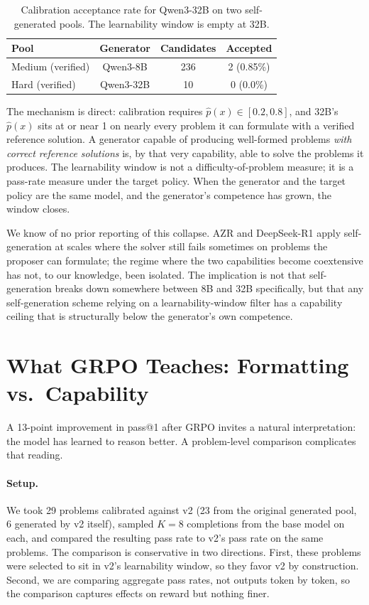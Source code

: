 \documentclass[11pt,a4paper]{article}
\begin{document}
\begin{table}[ht]
\centering
\caption{Calibration acceptance rate for Qwen3-32B on two self-generated pools. The learnability window is empty at 32B.}
\label{tab:scale-selfgen}
\begin{tabular}{lccc}
\toprule
Pool & Generator & Candidates & Accepted \\
\midrule
Medium (verified) & Qwen3-8B & 236 & 2 (0.85\%) \\
Hard (verified) & Qwen3-32B & 10 & 0 (0.0\%) \\
\bottomrule
\end{tabular}
\end{table}

The mechanism is direct: calibration requires $\hat{p}(x) \in [0.2, 0.8]$, and 32B's $\hat{p}(x)$ sits at or near 1 on nearly every problem it can formulate with a verified reference solution.
A generator capable of producing well-formed problems \emph{with correct reference solutions} is, by that very capability, able to solve the problems it produces.
The learnability window is not a difficulty-of-problem measure; it is a pass-rate measure under the target policy.
When the generator and the target policy are the same model, and the generator's competence has grown, the window closes.

We know of no prior reporting of this collapse.
AZR and DeepSeek-R1 apply self-generation at scales where the solver still fails sometimes on problems the proposer can formulate; the regime where the two capabilities become coextensive has not, to our knowledge, been isolated.
The implication is not that self-generation breaks down somewhere between 8B and 32B specifically, but that any self-generation scheme relying on a learnability-window filter has a capability ceiling that is structurally below the generator's own competence.

\section{What GRPO Teaches: Formatting vs.\ Capability}
\label{sec:formatting}

A 13-point improvement in pass@1 after GRPO invites a natural interpretation: the model has learned to reason better.
A problem-level comparison complicates that reading.

\paragraph{Setup.}
We took 29 problems calibrated against v2 (23 from the original generated pool, 6 generated by v2 itself), sampled $K = 8$ completions from the base model on each, and compared the resulting pass rate to v2's pass rate on the same problems.
The comparison is conservative in two directions.
First, these problems were selected to sit in v2's learnability window, so they favor v2 by construction.
Second, we are comparing aggregate pass rates, not outputs token by token, so the comparison captures effects on reward but nothing finer.
\end{document}
